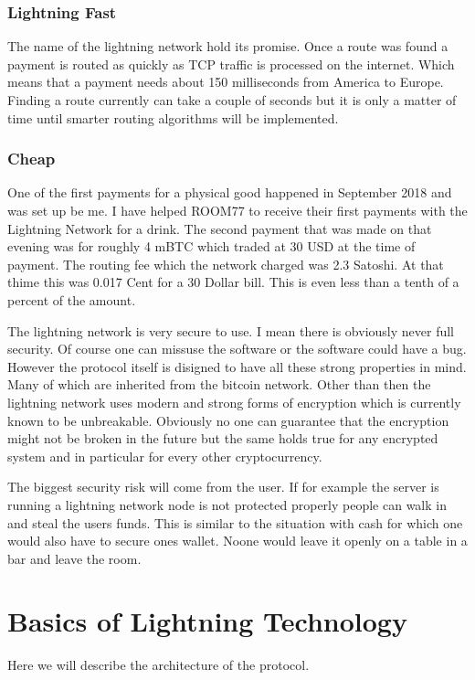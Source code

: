 \documentclass[a4paper,12pt,oneside,openany]{book}
\begin{document}
\subsection{Lightning Fast}
The name of the lightning network hold its promise.
Once a route was found a payment is routed as quickly as TCP traffic is processed on the internet.
Which means that a payment needs about 150 milliseconds from America to Europe.
Finding a route currently can take a couple of seconds but it is only a matter of time until smarter routing algorithms will be implemented.


\subsection{Cheap}
One of the first payments for a physical good happened in September 2018 and was set up be me. 
I have helped ROOM77 to receive their first payments with the Lightning Network for a drink.
The second payment that was made on that evening was for roughly 4 mBTC which traded at 30 USD at the time of payment.
The routing fee which the network charged was 2.3 Satoshi.
At that thime this was 0.017 Cent for a 30 Dollar bill. 
This is even less than a tenth of a percent of the amount.


The lightning network is very secure to use.
I mean there is obviously never full security.
Of course one can missuse the software or the software could have a bug.
However the protocol itself is disigned to have all these strong properties in mind.
Many of which are inherited from the bitcoin network.
Other than then the lightning network uses modern and strong forms of encryption which is currently known to be unbreakable.
Obviously no one can guarantee that the encryption might not be broken in the future but the same holds true for any encrypted system and in particular for every other cryptocurrency.

The biggest security risk will come from the user.
If for example the server is running a lightning network node is not protected properly people can walk in and steal the users funds.
This is similar to the situation with cash for which one would also have to secure ones wallet.
Noone would leave it openly on a table in a bar and leave the room.

\chapter{Basics of Lightning Technology}
Here we will describe the architecture of the protocol.
\end{document}

